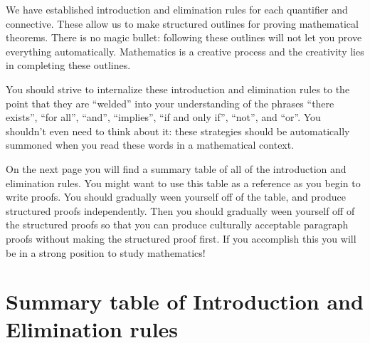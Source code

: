 We have established introduction and elimination rules for each quantifier and connective.  These allow us to make structured outlines for proving mathematical theorems.  There is no magic bullet:  following these outlines will not let you prove everything automatically.  Mathematics is a creative process and the creativity lies in completing these outlines.

You should strive to internalize these introduction and elimination rules to the point that they are ``welded'' into your understanding of the phrases ``there exists'', ``for all'', ``and'', ``implies'', ``if and only if'', ``not'', and ``or''.  You shouldn't even need to think about it:  these strategies should be automatically summoned when you read these words in a mathematical context.

On the next page you will find a summary table of all of the introduction and elimination rules.  You might want to use this table as a reference as you begin to write proofs. You should gradually ween yourself off of the table, and produce structured proofs independently.  Then you should gradually ween yourself off of the structured proofs so that you can produce culturally acceptable paragraph proofs without making the structured proof first.  If you accomplish this you will be in a strong position to study mathematics!


\newpage

\section{Summary table of Introduction and Elimination rules}


